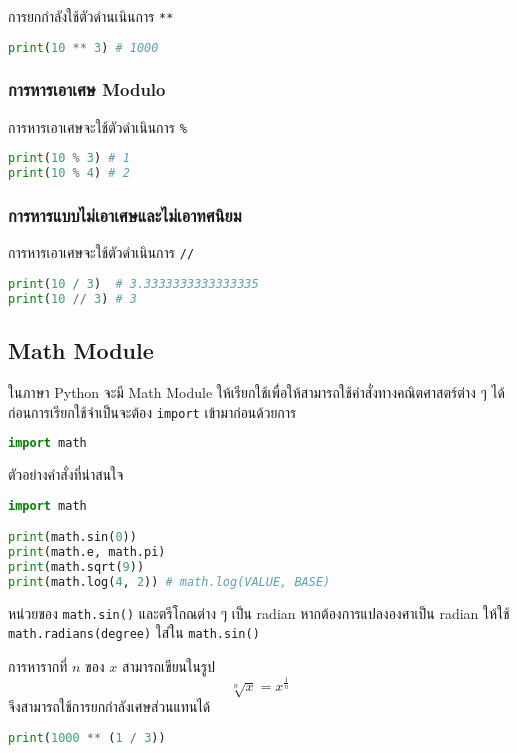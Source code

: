 การยกกำลังใช้ตัวดำนเนินการ \verb|**|

\begin{lstlisting}[language=Python]
print(10 ** 3) # 1000
\end{lstlisting}

\subsubsection{การหารเอาเศษ Modulo}

การหารเอาเศษจะใช้ตัวดำเนินการ \verb|%|

\begin{lstlisting}[language=Python]
print(10 % 3) # 1
print(10 % 4) # 2
\end{lstlisting}

\subsubsection{การหารแบบไม่เอาเศษและไม่เอาทศนิยม}

การหารเอาเศษจะใช้ตัวดำเนินการ \verb|//|

\begin{lstlisting}[language=Python]
print(10 / 3)  # 3.3333333333333335
print(10 // 3) # 3
\end{lstlisting}

\subsection{Math Module}

ในภาษา Python จะมี Math Module ให้เรียกใช้เพื่อให้สามารถใช้คำสั่งทางคณิตศาสตร์ต่าง ๆ ได้ ก่อนการเรียกใช้จำเป็นจะต้อง \verb|import| เข้ามาก่อนด้วยการ
\begin{lstlisting}[language=Python]
import math
\end{lstlisting}

ตัวอย่างคำสั่งที่น่าสนใจ
\begin{lstlisting}[language=Python]
import math

print(math.sin(0))
print(math.e, math.pi)
print(math.sqrt(9))
print(math.log(4, 2)) # math.log(VALUE, BASE)
\end{lstlisting}

\begin{remark}
    หน่วยของ \verb|math.sin()| และตรีโกณต่าง ๆ เป็น radian หากต้องการแปลงองศาเป็น radian ให้ใช้ \verb|math.radians(degree)| ใส่ใน \verb|math.sin()|
\end{remark}

การหารากที่ \(n\) ของ $x$ สามารถเขียนในรูป
\[
    \sqrt[n]{x} = x^{\frac{1}{n}}
\]
จึงสามารถใช้การยกกำลังเศษส่วนแทนได้
\begin{lstlisting}[language=Python]
print(1000 ** (1 / 3))
\end{lstlisting}